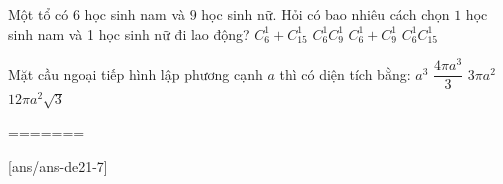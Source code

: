 \begin{ex}%
Một tổ có $6$ học sinh nam và $9$ học sinh nữ. Hỏi có bao nhiêu cách chọn $1$ học sinh nam và 1 học sinh nữ đi lao động?
\choice
{$C_6^1+C_{15}^1$}
{\True $C_6^1 C_9^1$}
{$C_6^1+C_9^1$}
{$C_6^1 C_{15}^1$}

\end{ex}

\begin{ex}%
Mặt cầu ngoại tiếp hình lập phương cạnh $a$ thì có diện tích bằng:
\choice
{$a^3$}
{$\dfrac{4\pi a^3}{3}$}
{\True $3\pi a^2$}
{$12\pi a^2 \sqrt{3}$}

\end{ex}

=======

[ans/ans-de21-7]

